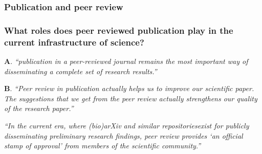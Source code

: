 \documentclass[12pt]{beamer}
\newcommand\ans[1]{{\it ``#1''}}
\newcommand\gap{\vspace{5mm}}
\begin{document}

\begin{frame}

\frametitle{
Publication and peer review
}

\end{frame}

\begin{frame} %

\frametitle{  What roles does peer reviewed publication play in the current infrastructure of science? }

{\bf A}. \ans{publication in a peer-reviewed journal remains the most important way of disseminating a complete set of research results.}

\gap

{\bf B}. \ans{Peer  review  in  publication  actually  helps  us  to  improve  our  scientific  paper.   The suggestions that we get from the peer review actually strengthens our quality of the research paper.}


\ans{In the current era, where (bio)arXiv and similar repositoriesexist for publicly disseminating preliminary research findings, peer review provides `an official stamp of approval' from members of the scientific community.}







\end{frame}
\end{document}

